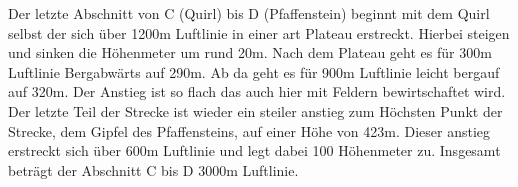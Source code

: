 Der letzte Abschnitt von C (Quirl) bis D (Pfaffenstein) beginnt mit dem Quirl selbst der sich über 1200m Luftlinie in einer art Plateau erstreckt. Hierbei steigen und sinken die Höhenmeter um rund 20m. Nach dem Plateau geht es für 300m Luftlinie Bergabwärts auf 290m. Ab da geht es für 900m Luftlinie leicht bergauf auf 320m. Der Anstieg ist so flach das auch hier mit Feldern bewirtschaftet wird. Der letzte Teil der Strecke ist wieder ein steiler anstieg zum Höchsten Punkt der Strecke, dem Gipfel des Pfaffensteins, auf einer Höhe von 423m. Dieser anstieg erstreckt sich über 600m Luftlinie und legt dabei 100 Höhenmeter zu. Insgesamt beträgt der Abschnitt C bis D 3000m Luftlinie.